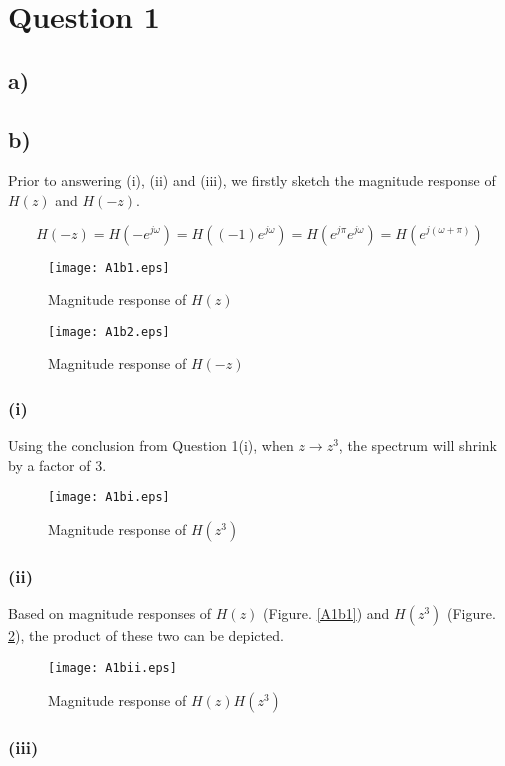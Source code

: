 \documentclass{article}
\newenvironment{homeworkProblem}[1]{
	\section*{#1}
	}{
}
\newenvironment{homeworkSection}[1]{
	\subsection*{#1}
	}{
}
\begin{document}
\begin{homeworkProblem}{Question 1}
\begin{homeworkSection}{a)}
\end{homeworkSection}

\begin{homeworkSection}{b)}

Prior to answering (i), (ii) and (iii), we firstly sketch the magnitude response of $H(z)$ and $H(-z)$.

\begin{equation}
H(-z) = H(-e^{j\omega}) = H((-1) e^{j\omega}) = H(e^{j\pi} e^{j\omega}) = H(e^{j(\omega+\pi)})
\end{equation}

\begin{figure}[H]
\begin{minipage}[t]{0.5\linewidth}
\centering
\texttt{[image: A1b1.eps]}
\caption{Magnitude response of $H(z)$}
\label{A1b1}
\end{minipage}
\begin{minipage}[t]{0.5\linewidth}
\centering
\texttt{[image: A1b2.eps]}
\caption{Magnitude response of $H(-z)$}
\label{A1b2}
\end{minipage}
\end{figure}

\subsubsection*{(i)}
Using the conclusion from Question 1(i), when $z\rightarrow z^3$, the spectrum will shrink by a factor of 3.

\begin{figure}[H]
\centering
\texttt{[image: A1bi.eps]}
\caption{Magnitude response of $H(z^3)$}
\label{A1bi}
\end{figure}

\subsubsection*{(ii)}
Based on magnitude responses of $H(z)$ (Figure. \ref{A1b1}) and $H(z^3)$ (Figure. \ref{A1bi}), the product of these two can be depicted.

\begin{figure}[H]
\centering
\texttt{[image: A1bii.eps]}
\caption{Magnitude response of $H(z) H(z^3)$}
\label{A1bii}
\end{figure}

\subsubsection*{(iii)}


\end{homeworkSection}
\end{homeworkProblem}
\end{document}
